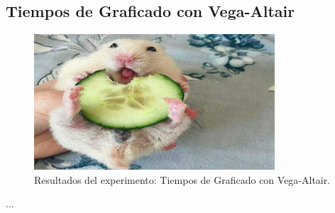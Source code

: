 \subsection{Tiempos de Graficado con Vega-Altair}
\label{exp:altair-time}

\begin{figure}[H]
    \centering
    \includegraphics[width=0.8\textwidth]{testing/images/altair_time.png}
    \caption{Resultados del experimento: Tiempos de Graficado con Vega-Altair.}
    \label{fig:altair-time}
\end{figure}

...
